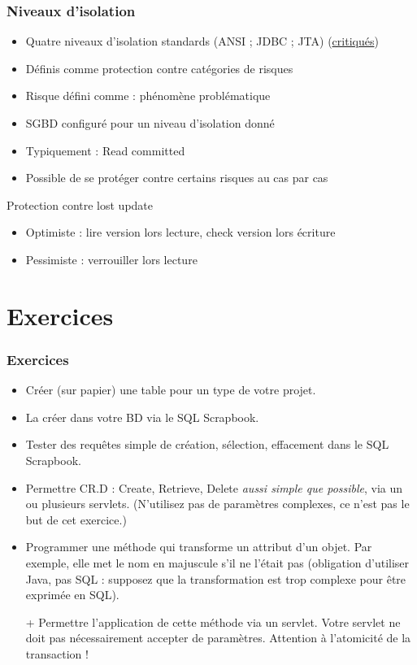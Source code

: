 \documentclass[english, french]{beamer}
\begin{document}
\begin{frame}
	\frametitle{Niveaux d’isolation}
	\begin{itemize}
		\item Quatre niveaux d’isolation standards (ANSI ; JDBC ; JTA) {\tiny (\href{http://www.cs.umb.edu/~poneil/iso.pdf}{critiqués})}
		\item Définis comme protection contre catégories de risques
		\item Risque défini comme : phénomène problématique
		\item SGBD configuré pour un niveau d’isolation donné
		\item Typiquement : Read committed
		\item Possible de se protéger contre certains risques au cas par cas
	\end{itemize}
	\begin{block}{Protection contre  lost update}
		\begin{itemize}
			\item Optimiste : lire version lors lecture, check version lors écriture
			\item Pessimiste : verrouiller lors lecture
		\end{itemize}
	\end{block}
\end{frame}

\section{Exercices}
\begin{frame}[label=Exercices]
	\frametitle{Exercices}
	\begin{itemize}
		\item Créer (sur papier) une table pour un type de votre projet.
		\item La créer dans votre BD via le SQL Scrapbook.
		\item Tester des requêtes simple de création, sélection, effacement dans le SQL Scrapbook.
		\item Permettre CR.D : Create, Retrieve, Delete \emph{aussi simple que possible}, via un ou plusieurs servlets. (N’utilisez pas de paramètres complexes, ce n’est pas le but de cet exercice.)
		\item Programmer une méthode qui transforme un attribut d’un objet. Par exemple, elle met le nom en majuscule s’il ne l’était pas (obligation d’utiliser Java, pas SQL : supposez que la transformation est trop complexe pour être exprimée en SQL).
		\item[+] Permettre l’application de cette méthode via un servlet. Votre servlet ne doit pas nécessairement accepter de paramètres. Attention à l’atomicité de la transaction !
	\end{itemize}
\end{frame}
\end{document}
